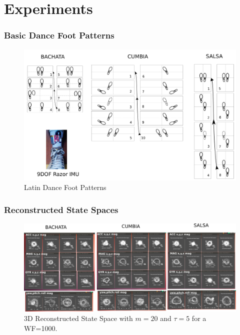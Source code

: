 \documentclass{beamer}
\theoremstyle{definition}
\begin{document}
\section{Experiments}


\begin{frame}
\frametitle{Basic Dance Foot Patterns}

\begin{figure}
\includegraphics[scale=0.13]{footpatterns}
\caption{Latin Dance Foot Patterns}
\end{figure}  
\end{frame}


\begin{frame}
\frametitle{Reconstructed State Spaces}

\begin{figure}
\includegraphics[scale=0.122]{bachata_cumbia_salsa_AccMagGyrYawPitchRoll}
\caption{3D Reconstructed State Space with $m=20$ and $\tau=5$ for a WF=1000.}
\end{figure}  
\end{frame}
\end{document}
